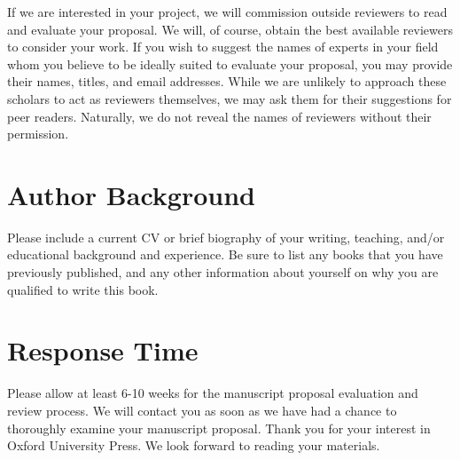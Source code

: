 \documentclass[10pt,dvipsnames,enabledeprecatedfontcommands]{scrartcl}
\begin{document}
If we are interested in your project, we will commission outside
reviewers to read and evaluate your proposal. We will, of course, obtain
the best available reviewers to consider your work. If you wish to
suggest the names of experts in your field whom you believe to be
ideally suited to evaluate your proposal, you may provide their names,
titles, and email addresses. While we are unlikely to approach these
scholars to act as reviewers themselves, we may ask them for their
suggestions for peer readers. Naturally, we do not reveal the names of
reviewers without their permission.

\section{Author Background}\label{author-background}

Please include a current CV or brief biography of your writing,
teaching, and/or educational background and experience. Be sure to list
any books that you have previously published, and any other information
about yourself on why you are qualified to write this book.

\section{Response Time}\label{response-time}

Please allow at least 6-10 weeks for the manuscript proposal evaluation
and review process. We will contact you as soon as we have had a chance
to thoroughly examine your manuscript proposal. Thank you for your
interest in Oxford University Press. We look forward to reading your
materials.
\end{document}
